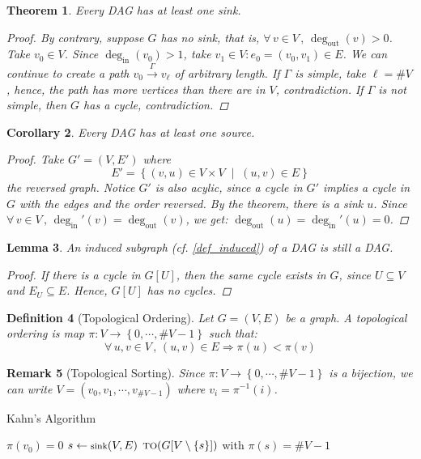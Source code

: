 \documentclass[12pt]{article}
\let\RA\Rightarrow
\newcommand{\set}[2]{\left\{{#1}\;\middle|\;{#2}\right\}}
\newcommand{\Forall}[1]{\forall\,{#1}\,,\,}
\newcommand{\seq}[2][0]{\left\{{#1},\cdots,{#2}\right\}}
\newcommand{\scrf}[1]{{\scriptstyle\textup{\footnotesize #1}}}
\newcommand{\rto}[1]{\overset{\displaystyle #1}{\longrightarrow}}
\newcommand{\sm}[1]{\setminus\{#1\}}
\newcommand*{\degin}{\deg_{\text{in}}}
\newcommand*{\degout}{\deg_{\text{out}}}
\newtheorem{theorem}{Theorem}[subsection]
\newtheorem{definition}[theorem]{Definition}
\newtheorem{lemma}[theorem]{Lemma}
\newtheorem{corollary}[theorem]{Corollary}
\newtheorem{remark}[theorem]{Remark}
\begin{document}
\begin{theorem}
  \label{dag_sink}
  Every DAG has at least one sink.
  \begin{proof}
    By contrary, suppose $G$ has no sink, that is, $\Forall{v\in V} \degout(v)>0$. Take $v_0\in V$. Since $\degin(v_0)>1$, take $v_1\in V:e_0=(v_0,v_1)\in E$. We can continue to create a path $v_0\rto{\Gamma}v_\ell$ of arbitrary length. If $\Gamma$ is simple, take $\ell=\#V$, hence, the path has more vertices than there are in $V$, contradiction. If $\Gamma$ is not simple, then $G$ has a cycle, contradiction.
  \end{proof}
\end{theorem}

\begin{corollary}
  Every DAG has at least one source.
  \begin{proof}
    Take $G'=(V,E')$ where $$E'=\set{(v,u)\in V\times V}{(u,v)\in E}$$ the reversed graph. Notice $G'$ is also acylic, since a cycle in $G'$ implies a cycle in $G$ with the edges and the order reversed. By the theorem, there is a sink $u$. Since $\Forall{v\in V}\degin'(v)=\degout(v)$, we get: $\degout(u)=\degin'(u)=0$.
  \end{proof}
\end{corollary}

\begin{lemma}
  \label{induced_DAG}
  An induced subgraph (cf. \ref{def_induced}) of a DAG is still a DAG.
  \begin{proof}
    If there is a cycle in $G[U]$, then the same cycle exists in $G$, since $U\subseteq V$ and $E_U\subseteq E$. Hence, $G[U]$ has no cycles.
  \end{proof}
\end{lemma}

\begin{definition}[Topological Ordering]
  Let $G=(V,E)$ be a graph. A topological ordering is map $\pi:V\to\seq{\#V-1}$ such that:
  $$\Forall{u,v\in V}(u,v)\in E\RA \pi(u)<\pi(v)$$
\end{definition}

\begin{remark}[Topological Sorting]
  Since $\pi:V\to\seq{\#V-1}$ is a bijection, we can write $V=(v_0,v_1,\cdots,v_{\#V-1})$ where $v_i=\pi^{-1}(i)$.
\end{remark}

\begin{algorithm}[H]
  \caption{Kahn's Algorithm}
  \begin{algorithmic}
    \Function{$\scrf{TO}$}{$G=(V,E)$}
        \State \Return $\pi(v_0)=0$
      \Else
        \State $s \gets \scrf{sink}(V,E)$
        \State \Return $\scrf{TO}(G[V\sm{s}])$ with $\pi(s)=\#V-1$
      \EndIf
    \EndFunction
  \end{algorithmic}
  \label{Kahn}
\end{algorithm}
\end{document}
